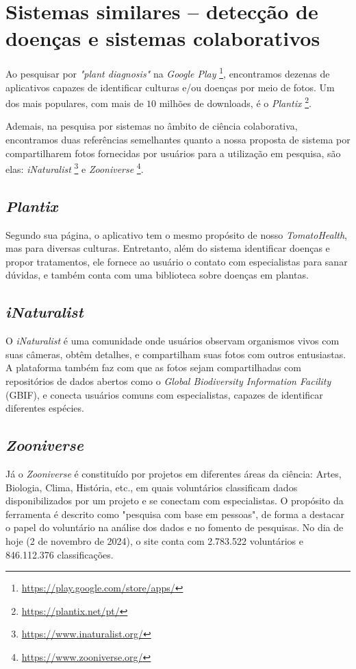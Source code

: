 \section{{Sistemas similares -- detecção de doenças e sistemas colaborativos}}

Ao pesquisar por \textit{"plant diagnosis"} na \textit{Google Play} \footnote{\url{https://play.google.com/store/apps/}}, encontramos dezenas de aplicativos capazes de identificar culturas e/ou doenças por meio de fotos. Um dos mais populares, com mais de $10$ milhões de downloads, é o \textit{Plantix} \footnote{\url{https://plantix.net/pt/}}.

Ademais, na pesquisa por sistemas no âmbito de ciência colaborativa, encontramos duas referências semelhantes quanto a nossa proposta de sistema por compartilharem fotos fornecidas por usuários para a utilização em pesquisa, são elas: \textit{iNaturalist} \footnote{\url{https://www.inaturalist.org/}} e \textit{Zooniverse} \footnote{\url{https://www.zooniverse.org/}}.

\subsection{\textit{Plantix}}

Segundo sua página, o aplicativo tem o mesmo propósito de nosso \textit{TomatoHealth}, mas para diversas culturas. Entretanto, além do sistema identificar doenças e propor tratamentos, ele fornece ao usuário o contato com especialistas para sanar dúvidas, e também conta com uma biblioteca sobre doenças em plantas.

\subsection{\emph{iNaturalist}}

O \textit{iNaturalist} é uma comunidade onde usuários observam organismos vivos com suas câmeras, obtêm detalhes, e compartilham suas fotos com outros entusiastas. A plataforma também faz com que as fotos sejam compartilhadas com repositórios de dados abertos como o \textit{Global Biodiversity Information Facility} (GBIF), e conecta usuários comuns com especialistas, capazes de identificar diferentes espécies.

\subsection{\emph{Zooniverse}}

Já o \textit{Zooniverse} é constituído por projetos em diferentes áreas da ciência: Artes, Biologia, Clima, História, etc., em quais voluntários classificam dados disponibilizados por um projeto e se conectam com especialistas. O propósito da ferramenta é descrito como "pesquisa com base em pessoas", de forma a destacar o papel do voluntário na análise dos dados e no fomento de pesquisas. No dia de hoje (2 de novembro de 2024), o site conta com 2.783.522 voluntários e 846.112.376 classificações.
